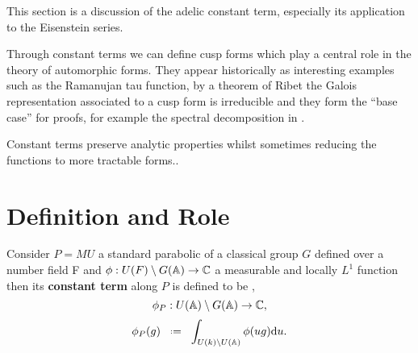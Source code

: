 This section is a discussion of the adelic constant term, especially its application to the Eisenstein series. 

Through constant terms we can define cusp forms which play a central role in the theory of automorphic forms. They appear historically as interesting examples such as the Ramanujan tau function, by a theorem of Ribet \cite[T2.3]{serreProceedingsInternationalConference1977} the Galois representation associated to a cusp form is irreducible and they form the ``base case'' for proofs, for example the spectral decomposition in \cite{moeglinSpectralDecompositionEisenstein1995}.

Constant terms preserve analytic properties whilst sometimes reducing the functions to more tractable forms..\label{constant_terms}


\section{Definition and Role} \label{cuspidal_form_definition}\label{sec:L-functions}
Consider \(P=MU\) a standard parabolic of a classical group \(G\) defined over a number field F and \(\phi: U(F)\setminus G(\A) \to \C\) a measurable and locally \(L^1\) function then its \textbf{constant term} along \(P\) is defined to be \cite[I.2.6]{moeglinSpectralDecompositionEisenstein1995},
\[\phi_P :  U(\A)\setminus G(\A) \to \C,\]
\[\phi_P(g) \defeq \int_{U(k)\setminus U(\A)}\phi(ug) \mathrm{d}u.\]

